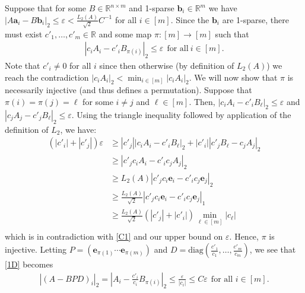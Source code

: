 \documentclass[journal, onecolumn]{IEEEtran}
\begin{document}
Suppose that for some $B \in \mathbb{R}^{n \times m}$ and 1-sparse $\mathbf{b}_i \in \mathbb{R}^m$ we have  $|A\mathbf{a}_i - B\mathbf{b}_i|_2 \leq \varepsilon < \frac{L_2(A)}{\sqrt{2}}C^{-1}$ for all $i \in [m]$. Since the $\mathbf{b}_i$ are 1-sparse, there must exist $c'_1, \ldots, c'_m \in \mathbb{R}$ and some map $\pi: [m] \to [m]$ such that 
\begin{align}\label{1D}
|c_iA_i - c'_iB_{\pi(i)}|_2 \leq \varepsilon \ \ \text{for all} \  i \in [m].
\end{align} 
Note that $c'_i \neq 0$ for all $i$ since then otherwise (by definition of $L_2(A)$) we reach the contradiction $|c_iA_i|_2 < \min_{i \in [m]}|c_iA_i|_2$. We will now show that $\pi$ is necessarily injective (and thus defines a permutation). Suppose that $\pi(i) = \pi(j) = \ell$ for some $i \neq j$ and $\ell \in [m]$. Then, $|c_iA_i - c'_iB_{\ell}|_2  \leq \varepsilon$ and $|c_jA_j - c'_jB_{\ell}|_2 \leq \varepsilon$. Using the triangle inequality followed by application of the definition of $L_2$, we have:
\begin{align*}
(|c'_i| + |c'_j|) \varepsilon
&\geq |c'_j||c_iA_i - c'_iB_{\ell}|_2 + |c'_i||c'_jB_{\ell} - c_jA_j|_2 \\
&\geq |c'_jc_iA_i - c'_ic_jA_j|_2 \\
&\geq L_2(A)|c'_jc_i\mathbf{e}_i - c'_ic_j\mathbf{e}_j|_2 \\
&\geq \frac{L_2(A)}{\sqrt{2}}|c'_jc_i\mathbf{e}_i - c'_ic_j\mathbf{e}_j|_1 \\
&\geq \frac{L_2(A)}{\sqrt{2}} \left( |c'_j| + |c'_i| \right) \min_{\ell \in [m]} |c_\ell | \\
\end{align*}
%
which is in contradiction with \eqref{C1} and our upper bound on $\varepsilon$. Hence, $\pi$ is injective. Letting $P = \left( \mathbf{e}_{\pi(1)} \cdots \mathbf{e}_{\pi(m)}\right)$ and $D = \text{diag}(\frac{c'_1}{c_1},\ldots,\frac{c'_m}{c_m})$, we see that \eqref{1D} becomes 
\begin{align}
|(A - BPD)_i|_2 = |A_i - \frac{c'_i}{c_i}B_{\pi(i)}|_2 \leq \frac{\varepsilon}{|c_i|} \leq C\varepsilon \ \ \text{for all } i \in [m].
\end{align}
\end{document}
